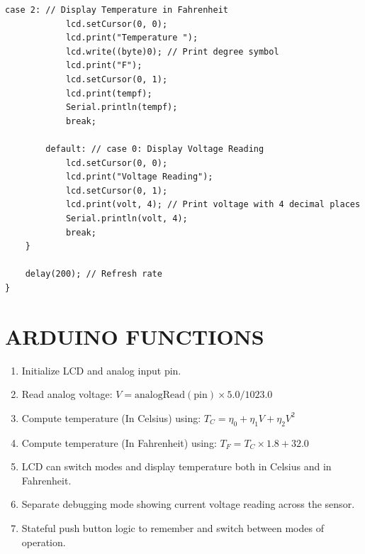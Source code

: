 \documentclass{article}
\begin{document}
\begin{lstlisting}[style=arduinostyle, caption={Arduino Sketch (main.cpp)}, label={lst:arduino}]
        case 2: // Display Temperature in Fahrenheit
            lcd.setCursor(0, 0);
            lcd.print("Temperature ");
            lcd.write((byte)0); // Print degree symbol
            lcd.print("F");
            lcd.setCursor(0, 1);
            lcd.print(tempf);
            Serial.println(tempf);
            break;
            
        default: // case 0: Display Voltage Reading
            lcd.setCursor(0, 0);
            lcd.print("Voltage Reading");
            lcd.setCursor(0, 1);
            lcd.print(volt, 4); // Print voltage with 4 decimal places
            Serial.println(volt, 4);
            break;
    }
    
    delay(200); // Refresh rate
}
\end{lstlisting}

\newpage
\section*{ARDUINO FUNCTIONS}
\begin{enumerate}
    \item Initialize LCD and analog input pin.
    \item Read analog voltage: $V = \text{analogRead}(\text{pin}) \times 5.0 / 1023.0$
    \item Compute temperature (In Celsius) using: $T_C = \eta_0 + \eta_1 V + \eta_2 V^2$
    \item Compute temperature (In Fahrenheit) using: $T_F = T_C \times 1.8 + 32.0$
    \item LCD can switch modes and display temperature both in Celsius and in Fahrenheit.
    \item Separate debugging mode showing current voltage reading across the sensor.
    \item Stateful push button logic to remember and switch between modes of operation.
\end{enumerate}
\end{document}
